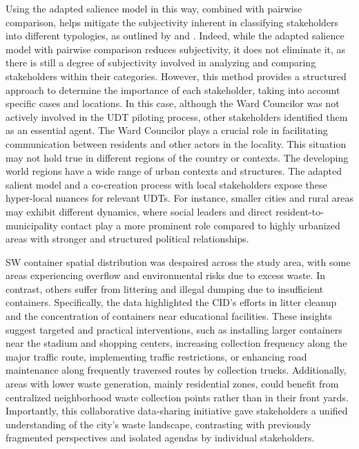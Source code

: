 \documentclass[authoryear,preprint,review,doubleblind, 12pt]{elsarticle}
\begin{document}
    Using the adapted salience model in this way, combined with pairwise comparison, helps mitigate the subjectivity inherent in classifying stakeholders into different typologies, as outlined by \citet{Mitchell1997} and \citet{Shafique2022}. Indeed, while the adapted salience model with pairwise comparison reduces subjectivity, it does not eliminate it, as there is still a degree of subjectivity involved in analyzing and comparing stakeholders within their categories. However, this method provides a structured approach to determine the importance of each stakeholder, taking into account specific cases and locations. In this case, although the Ward Councilor was not actively involved in the UDT piloting process, other stakeholders identified them as an essential agent. The Ward Councilor plays a crucial role in facilitating communication between residents and other actors in the locality. This situation may not hold true in different regions of the country or contexts. The developing world regions have a wide range of urban contexts and structures. The adapted salient model and a co-creation process with local stakeholders expose these hyper-local nuances for relevant UDTs. For instance, smaller cities and rural areas may exhibit different dynamics, where social leaders and direct resident-to-municipality contact play a more prominent role compared to highly urbanized areas with stronger and structured political relationships.

SW container spatial distribution was despaired across the study area, with some areas experiencing overflow and environmental risks due to excess waste. In contrast, others suffer from littering and illegal dumping due to insufficient containers. Specifically, the data highlighted the CID's efforts in litter cleanup and the concentration of containers near educational facilities. These insights suggest targeted and practical interventions, such as installing larger containers near the stadium and shopping centers, increasing collection frequency along the major traffic route, implementing traffic restrictions, or enhancing road maintenance along frequently traversed routes by collection trucks. Additionally, areas with lower waste generation, mainly residential zones, could benefit from centralized neighborhood waste collection points rather than in their front yards. Importantly, this collaborative data-sharing initiative gave stakeholders a unified understanding of the city's waste landscape, contrasting with previously fragmented perspectives and isolated agendas by individual stakeholders.
    
\end{document}
